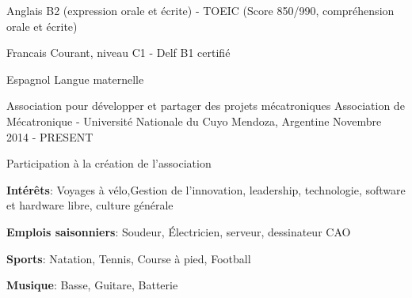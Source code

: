 

\begin{cvskills}
	
	\cvskill
	{Anglais} %
	{B2 (expression orale et écrite) - TOEIC (Score 850/990, compréhension orale et écrite)} %
	
	\cvskill
	{Francais} %
	{Courant, niveau C1 - Delf B1 certifié} %
	
	\cvskill
	{Espagnol} %
	{Langue maternelle } %
	
	
\end{cvskills}



\begin{cventries}
	
	\cventry
	{Association  pour développer et partager des projets mécatroniques} %
	{Association de Mécatronique - Université Nationale du Cuyo} %
	{Mendoza, Argentine} %
	{Novembre 2014 - PRESENT} %
	{
		\begin{cvitems} %
			\item {Participation à la création de l'association}
		\end{cvitems}
	}
	\cventry
	{} %
	{} %
	{} %
	{} %
	{
		\begin{cvitems} %
			\item {\textbf{Intérêts}: Voyages à vélo,Gestion de l'innovation, leadership, technologie, software et hardware libre, culture générale}
			\item {\textbf{Emplois saisonniers}: Soudeur, Électricien, serveur, dessinateur CAO}
			\item {\textbf{Sports}: Natation, Tennis, Course à pied, Football}
			\item {\textbf{Musique}: Basse, Guitare, Batterie}
		\end{cvitems}
	}		
\end{cventries}
